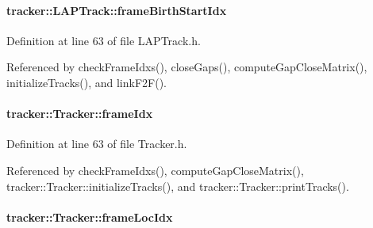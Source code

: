 \paragraph[{\texorpdfstring{frame\+Birth\+Start\+Idx}{frameBirthStartIdx}}]{ tracker\+::\+L\+A\+P\+Track\+::frame\+Birth\+Start\+Idx\hspace{0.3cm}{\ttfamily [protected]}}\hypertarget{classtracker_1_1LAPTrack_a19b9e3e8cc4e908fa2e3816f386a7f27}{}\label{classtracker_1_1LAPTrack_a19b9e3e8cc4e908fa2e3816f386a7f27}


Definition at line 63 of file L\+A\+P\+Track.\+h.



Referenced by check\+Frame\+Idxs(), close\+Gaps(), compute\+Gap\+Close\+Matrix(), initialize\+Tracks(), and link\+F2\+F().

\paragraph[{\texorpdfstring{frame\+Idx}{frameIdx}}]{ tracker\+::\+Tracker\+::frame\+Idx\hspace{0.3cm}{\ttfamily [inherited]}}\hypertarget{classtracker_1_1Tracker_aa3e32ff8183fe70af1d351f6324e7615}{}\label{classtracker_1_1Tracker_aa3e32ff8183fe70af1d351f6324e7615}


Definition at line 63 of file Tracker.\+h.



Referenced by check\+Frame\+Idxs(), compute\+Gap\+Close\+Matrix(), tracker\+::\+Tracker\+::initialize\+Tracks(), and tracker\+::\+Tracker\+::print\+Tracks().

\paragraph[{\texorpdfstring{frame\+Loc\+Idx}{frameLocIdx}}]{ tracker\+::\+Tracker\+::frame\+Loc\+Idx\hspace{0.3cm}{\ttfamily [inherited]}}\hypertarget{classtracker_1_1Tracker_a089a3af55a168691f56d856658786159}{}\label{classtracker_1_1Tracker_a089a3af55a168691f56d856658786159}


